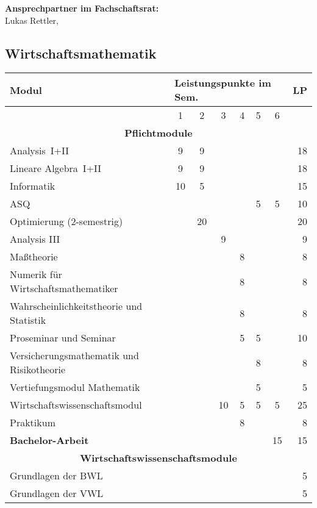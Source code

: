 \textbf{Ansprechpartner im Fachschaftsrat:}\\
Lukas Rettler, \\

\newpage

\subsection{Wirtschaftsmathematik}
\label{studiengang_wima}

\begin{table}[tbp]
	\begin{small}
		\begin{tabularx}{\textwidth}{|X||c|c|c|c|c|c||r|}\hline
			\textbf{Modul}&\multicolumn{6}{l||}{\textbf{Leistungspunkte im Sem.}}&\textbf{LP}\\\hline
			&1&2&3&4&5&6&\\\hline\hline
			\multicolumn{8}{|c|}{\textbf{Pflichtmodule}}\\\hline
			Analysis~I+II&9&9&&&&&18\\\hline
			Lineare Algebra~I+II&9&9&&&&&18\\\hline
			Informatik&10&5&&&&&15\\\hline
			ASQ&&&&&5&5&10\\\hline
			Optimierung (2-semestrig)&&20&&&&&20\\\hline
			Analysis III&&&9&&&&9\\\hline
			Maßtheorie&&&&8&&&8\\\hline
			Numerik für Wirtschaftsmathematiker&&&&8&&&8\\\hline
			Wahrscheinlichkeitstheorie und Statistik&&&&8&&&8\\\hline
			Proseminar und Seminar&&&&5&5&&10\\\hline
			Versicherungsmathematik und Risikotheorie&&&&&8&&8\\\hline
			Vertiefungsmodul Mathematik&&&&&5&&5\\\hline
			Wirtschaftswissenschaftsmodul&&&10&5&5&5&25\\\hline
			Praktikum&&&&8&&&8\\\hline\hline
			\textbf{Bachelor-Arbeit}&&&&&&15&15\\\hline\hline
			\multicolumn{8}{|c|}{\textbf{Wirtschaftswissenschaftsmodule}}\\\hline
			\multicolumn{7}{|X||}{Grundlagen der BWL}&5\\\hline
			\multicolumn{7}{|X||}{Grundlagen der VWL}&5\\\hline

\end{tabularx}
\end{small}
\end{table}
